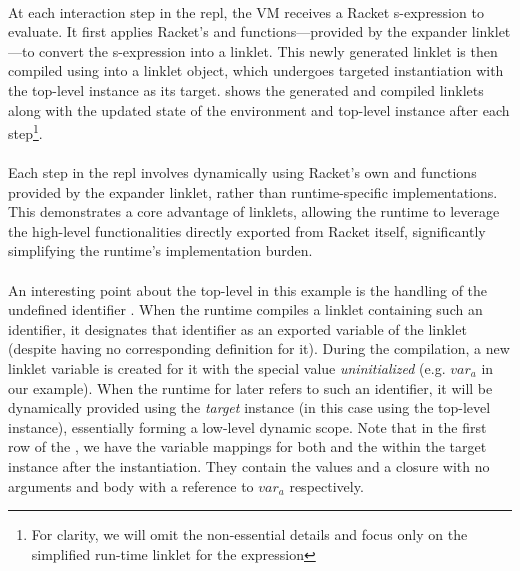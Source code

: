 		\paragraph{}%
			At each interaction step in the \gls{repl}, the VM receives a Racket s-expression to evaluate. It first applies Racket's  and  functions—provided by the expander linklet—to convert the s-expression into a linklet. This newly generated linklet is then compiled using  into a linklet object, which undergoes targeted instantiation with the top-level instance as its target.  shows the generated and compiled linklets along with the updated state of the environment and top-level instance after each step\footnote{For clarity, we will omit the non-essential details and focus only on the simplified run-time linklet for the expression}.


		\paragraph{}%
			Each step in the \gls{repl} involves dynamically using Racket's own  and  functions provided by the expander linklet, rather than runtime-specific implementations. This demonstrates a core advantage of linklets, allowing the runtime to leverage the high-level functionalities directly exported from Racket itself, significantly simplifying the runtime's implementation burden.

		\paragraph{}%
			An interesting point about the top-level in this example is the handling of the undefined identifier . When the runtime compiles a linklet containing such an identifier, it designates that identifier as an exported variable of the linklet (despite having no corresponding definition for it). During the compilation, a new linklet variable is created for it with the special value \emph{uninitialized} (e.g. $var_a$ in our example). When the runtime for later refers to such an identifier, it will be dynamically provided using the \emph{target} instance (in this case using the top-level instance), essentially forming a low-level dynamic scope. Note that in the first row of the , we have the variable mappings for both  and the  within the target instance after the instantiation. They contain the values  and a closure with no arguments and body with a reference to $var_a$ respectively.


